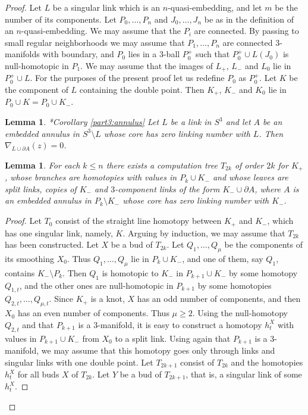 \documentclass[a4paper,12pt,reqno,oneside]{amsart} %
\theoremstyle{plain}
\newtheorem{lemma}[theorem]{Lemma}
\theoremstyle{definition}
\theoremstyle{named}
\def\but{\setminus}
\renewcommand{\:}{\colon}
\begin{document}
\begin{proof} Let $L$ be a singular link which is an $n$-quasi-embedding, and let $m$ be the number of its components.
Let $P_0,\dots,P_n$ and $J_0,\dots,J_n$ be as in the definition of an $n$-quasi-embedding.
We may assume that the $P_i$ are connected.
By passing to small regular neighborhoods we may assume that $P_1,\dots,P_n$ are connected $3$-manifolds with boundary,
and $P_0$ lies in a $3$-ball $P_0^+$ such that $P_0^+\cup L(J_0)$ is null-homotopic in $P_1$.
We may assume that the images of $L_+$, $L_-$ and $L_0$ lie in $P_0^+\cup L$.
For the purposes of the present proof let us redefine $P_0$ as $P_0^+$.
Let $K$ be the component of $L$ containing the double point.
Then $K_+$, $K_-$ and $K_0$ lie in $P_0\cup K=P_0\cup K_-$.

\begin{lemma} \cite{M24-3}*{Corollary \ref{part3:annulus}} 
\label{annulus0}
Let $L$ be a link in $S^3$ and let $A$ be an embedded annulus in $S^3\but L$ whose core has zero linking number with $L$.
Then $\nabla_{L\cup\partial A}(z)=0$.
\end{lemma}

\begin{lemma} \label{trees}
For each $k\le n$ there exists a computation tree $T_{2k}$ of order $2k$ for $K_+$, whose branches are homotopies with values 
in $P_k\cup K_-$ and whose leaves are split links, copies of $K_-$ and $3$-component links of the form $K_-\cup\partial A$, where $A$ is 
an embedded annulus in $P_k\but K_-$ whose core has zero linking number with $K_-$. 
\end{lemma}

\begin{proof} Let $T_0$ consist of the straight line homotopy between $K_+$ and $K_-$, which has one singular link, namely, $K$.
Arguing by induction, we may assume that $T_{2k}$ has been constructed.
Let $X$ be a bud of $T_{2k}$.
Let $Q_1,\dots,Q_\mu$ be the components of its smoothing $X_0$.
Thus $Q_1,\dots,Q_\mu$ lie in $P_k\cup K_-$, and one of them, say $Q_1$, contains $K_-\but P_k$.
Then $Q_1$ is homotopic to $K_-$ in $P_{k+1}\cup K_-$ by some homotopy $Q_{1,t}$, and the other ones are null-homotopic 
in $P_{k+1}$ by some homotopies $Q_{2,t},\dots,Q_{\mu,t}$.
Since $K_+$ is a knot, $X$ has an odd number of components, and then $X_0$ has an even number of components.
Thus $\mu\ge 2$.
Using the null-homotopy $Q_{2,t}$ and that $P_{k+1}$ is a $3$-manifold, it is easy to construct a homotopy $h_t^X$ with values in 
$P_{k+1}\cup K_-$ from $X_0$ to a split link.
Using again that $P_{k+1}$ is a $3$-manifold, we may assume that this homotopy goes only through links and singular links 
with one double point.
Let $T_{2k+1}$ consist of $T_{2k}$ and the homotopies $h_t^X$ for all buds $X$ of $T_{2k}$.
Let $Y$ be a bud of $T_{2k+1}$, that is, a singular link of some $h_t^X$.


\end{proof}
\end{proof}
\end{document}
